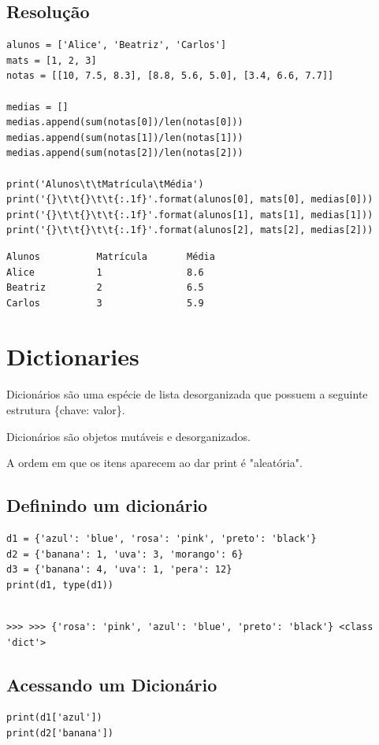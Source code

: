 \documentclass[presentation]{beamer}
\begin{document}
\subsection{Resolução}
\label{sec:orgheadline57}
\begin{verbatim}
alunos = ['Alice', 'Beatriz', 'Carlos']
mats = [1, 2, 3]
notas = [[10, 7.5, 8.3], [8.8, 5.6, 5.0], [3.4, 6.6, 7.7]]

medias = []
medias.append(sum(notas[0])/len(notas[0]))
medias.append(sum(notas[1])/len(notas[1]))
medias.append(sum(notas[2])/len(notas[2]))

print('Alunos\t\tMatrícula\tMédia')
print('{}\t\t{}\t\t{:.1f}'.format(alunos[0], mats[0], medias[0]))
print('{}\t\t{}\t\t{:.1f}'.format(alunos[1], mats[1], medias[1]))
print('{}\t\t{}\t\t{:.1f}'.format(alunos[2], mats[2], medias[2]))
\end{verbatim}

\begin{verbatim}
Alunos          Matrícula       Média
Alice           1               8.6
Beatriz         2               6.5
Carlos          3               5.9
\end{verbatim}

\section{Dictionaries}
\label{sec:orgheadline65}
Dicionários são uma espécie de lista desorganizada que possuem a seguinte estrutura \{chave: valor\}.

Dicionários são objetos mutáveis e desorganizados.

A ordem em que os itens aparecem ao dar print é "aleatória".
\subsection{Definindo um dicionário}
\label{sec:orgheadline59}
\begin{verbatim}
d1 = {'azul': 'blue', 'rosa': 'pink', 'preto': 'black'}
d2 = {'banana': 1, 'uva': 3, 'morango': 6}
d3 = {'banana': 4, 'uva': 1, 'pera': 12}
print(d1, type(d1))
\end{verbatim}

\begin{verbatim}

>>> >>> {'rosa': 'pink', 'azul': 'blue', 'preto': 'black'} <class 'dict'>
\end{verbatim}
\subsection{Acessando um Dicionário}
\label{sec:orgheadline60}
\begin{verbatim}
print(d1['azul']) 
print(d2['banana'])
\end{verbatim}
\end{document}
